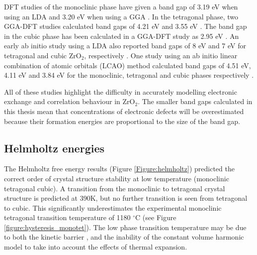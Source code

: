 DFT studies of the monoclinic phase have given a band gap of 3.19 eV when using an LDA \cite{Foster2002} and 3.20 eV when using a GGA \cite{Jaffe2005}. In the tetragonal phase, two GGA-DFT studies calculated band gaps of 4.21 eV \cite{Eichler2001} and 3.55 eV \cite{Jaffe2005}. The band gap in the cubic phase has been calculated in a GGA-DFT study as 2.95 eV \cite{Jaffe2005}. An early ab initio study using a LDA also reported band gaps of 8 eV and 7 eV for tetragonal and cubic ZrO$_{2}$, respectively \cite{morinaga1983electronic}. One study using an ab initio linear combination of atomic orbitals (LCAO) method calculated band gaps of 4.51 eV, 4.11 eV and 3.84 eV for the monoclinic, tetragonal and cubic phases respectively \cite{Zandiehnadem1988}.

All of these studies highlight the difficulty in accurately modelling electronic exchange and correlation behaviour in ZrO$_{2}$. The smaller band gaps calculated in this thesis mean that concentrations of electronic defects will be overestimated because their formation energies are proportional to the size of the band gap. 

\subsection{Helmholtz energies}

The Helmholtz free energy results (Figure \ref{Figure:helmholtz}) predicted the correct order of crystal structure stability at low temperature (monoclinic \textrightarrow tetragonal \textrightarrow cubic). A transition from the monoclinic to tetragonal crystal structure is predicted at 390K, but no further transition is seen from tetragonal to cubic. This significantly underestimates the experimental monoclinic \textrightarrow tetragonal transition temperature of 1180 $^{\circ}$C (see Figure \ref{figure:hysteresis_monotet}). The low phase transition temperature may be due to both the kinetic barrier \cite{bansal1972martensitic,bansal1974martensitic}, and the inability of the constant volume harmonic model to take into account the effects of thermal expansion. 

